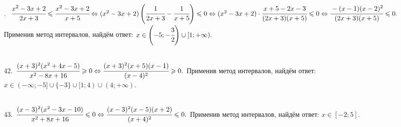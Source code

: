 \documentclass[12pt]{article}
\begin{document}
\begin{figure}[ht!]
\end{figure}\newpage{}. $\cfrac{x^2-3x+2}{2x+3}\leqslant\cfrac{x^2-3x+2}{x+5}\Leftrightarrow (x^2-3x+2)\left(\cfrac{1}{2x+3}-\cfrac{1}{x+5}\right)\leqslant0
\Leftrightarrow (x^2-3x+2)\cdot\cfrac{x+5-2x-3}{(2x+3)(x+5)}\leqslant0\Leftrightarrow\cfrac{-(x-1)(x-2)^2}{(2x+3)(x+5)}\leqslant0.$ Применив метод интервалов, найдём ответ: $x\in\left(-5;-\cfrac{3}{2}\right)\cup[1;+\infty).$
\begin{figure}[ht!]
\end{figure}\\
42. $\cfrac{(x+3)^2(x^2+4x-5)}{x^2-8x+16}\geqslant0\Leftrightarrow\cfrac{(x+3)^2(x+5)(x-1)}{(x-4)^2}\geqslant0.$ Применив метод интервалов, найдём ответ: $x\in(-\infty;-5]\cup\{-3\}\cup[1;4)\cup(4;+\infty).$
\begin{figure}[ht!]
\end{figure}\\
43. $\cfrac{(x-3)^2(x^2-3x-10)}{x^2+8x+16}\leqslant0\Leftrightarrow\cfrac{(x-3)^2(x-5)(x+2)}{(x+4)^2}\leqslant0.$ Применив метод интервалов, найдём ответ: $x\in[-2;5].$
\begin{figure}[ht!]
\end{figure}\\
\end{document}

